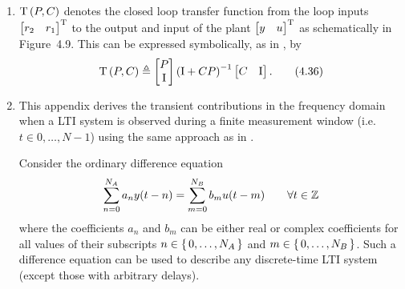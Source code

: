 \documentclass{responseletter}
\begin{document}
\begin{enumerate}
  \item 
  \begin{newquote}
  $\mathrm{T}\left(P,C\right)$ denotes the closed loop transfer function from the loop inputs $ \begin{bmatrix} r_2 & r_1 \end{bmatrix} ^{\mathrm{T}}$ to the output and input of the plant $ \begin{bmatrix} y & u \end{bmatrix} ^{\mathrm{T}}$ as schematically in Figure~4.9.
This can be expressed symbolically, as in \citet{Oomen2012SIRP}, by
\begin{equation}
\mathrm{T}\left(P, C\right) \triangleq
\begin{bmatrix}
  P\\
  \mathrm{I}
\end{bmatrix}
\left(\mathrm{I} + C P \right)^{-1}
\begin{bmatrix}
C & \mathrm{I}
\end{bmatrix}
\label{eq:lrmhinf:closedLoop}
\text{.}
\tag{4.36}
\end{equation}
  \end{newquote}

  \item
  \begin{newquote}
  

This appendix derives the transient contributions in the frequency domain when a \gls{LTI} system is observed during a finite measurement window (i.e. $t \in {0, \ldots, N-1}$) using the same approach as in \citet[Appendix 6.B]{Pintelon2012}.

Consider the ordinary difference equation
\begin{equation}
  \sum_{n=0}^{N_{A}} a_n y(t-n)
  =
  \sum_{m=0}^{N_{B}} b_m u(t-m)
  \qquad 
  \forall 
  t \in \mathbb{Z}
  \label{eq:nparam:leakage:diffeq}
\end{equation}
where the coefficients $a_n$ and $b_m$ can be either real or complex coefficients for all values of their subscripts $n \in \set{0, \ldots, \ensuremath{N_{A}}}$ and $m \in \set{0, \ldots, \ensuremath{N_{B}}}$.
Such a difference equation can be used to describe any discrete-time \gls{LTI} system (except those with arbitrary delays).


\end{newquote}
\end{enumerate}
\end{document}

